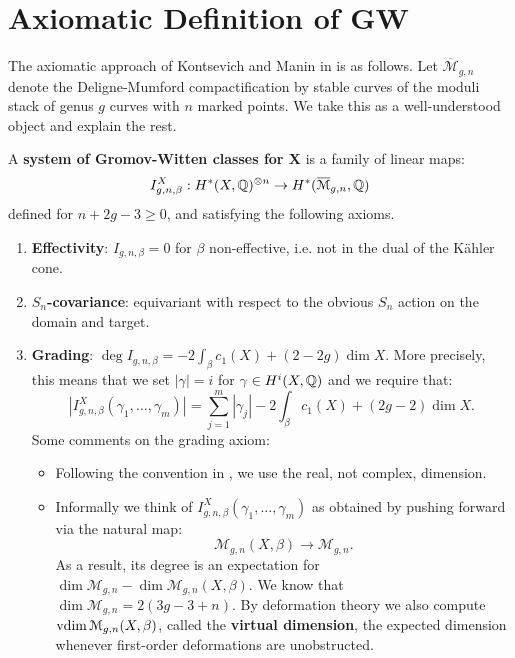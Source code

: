 \section{Axiomatic Definition of GW}
\label{sect:axiom}

The axiomatic approach of Kontsevich and Manin in \cite{km_gw} is as follows. Let $\overline{\mathcal{M}}_{g,n}$ denote the
Deligne-Mumford compactification by stable curves of the moduli stack of genus $g$ curves with $n$ marked points.
We take this as a well-understood object and explain the rest.

\begin{defin}[2.2 in \cite{km_gw}]
A \textbf{system of Gromov-Witten classes for X} is a family of linear maps:
\[	I_{g,n,\beta}^X : H^*(X,\mathbb Q)^{\otimes n} \to H^*(\overline{\mathcal{M}}_{g,n},\mathbb Q)	\]
defined for $n+2g-3\geq 0$, and satisfying the following axioms.
\begin{enumerate}
\item \textbf{Effectivity}: $I_{g,n,\beta} = 0$ for $\beta$ non-effective, i.e. not in the dual of the K\"ahler cone.

\item $S_n$\textbf{-covariance}: equivariant with respect to the obvious $S_n$ action on the domain and target.

\item \textbf{Grading}: $ \deg I_{g,n,\beta} =  - 2 \int_{\beta} c_1(X) + (2-2g) \dim X$. More precisely, this means that
we set $|\gamma| = i$ for $\gamma \in H^i(X,\mathbb Q)$ and we require that:
\[	\left| I_{g,n,\beta}^X(\gamma_1, \dots, \gamma_m)\right| = \sum_{j=1}^m |\gamma_j| - 2 \int_{\beta} c_1(X) + (2g-2) \dim X. 	\]
Some comments on the grading axiom:
\begin{itemize}
\item Following the convention in \cite{km_gw}, we use the real, not complex, dimension.
\item Informally we think of $I_{g,n,\beta}^X(\gamma_1, \dots, \gamma_m)$ as obtained by pushing forward via the natural map:
\[	\mathcal{M}_{g,n}(X,\beta) \to \mathcal{M}_{g,n} .	\]
As a result, its degree is an expectation for $\dim \mathcal{M}_{g,n}- \dim \mathcal{M}_{g,n}(X,\beta)$. 
We know that $\dim \mathcal{M}_{g,n} = 2(3g-3+n)$. By deformation theory we also compute	$\operatorname{vdim} \mathcal{M}_{g,n}(X,\beta)$,
called the \textbf{virtual dimension}, the expected dimension whenever first-order deformations are unobstructed.


\end{itemize}
\end{enumerate}
\end{defin}
